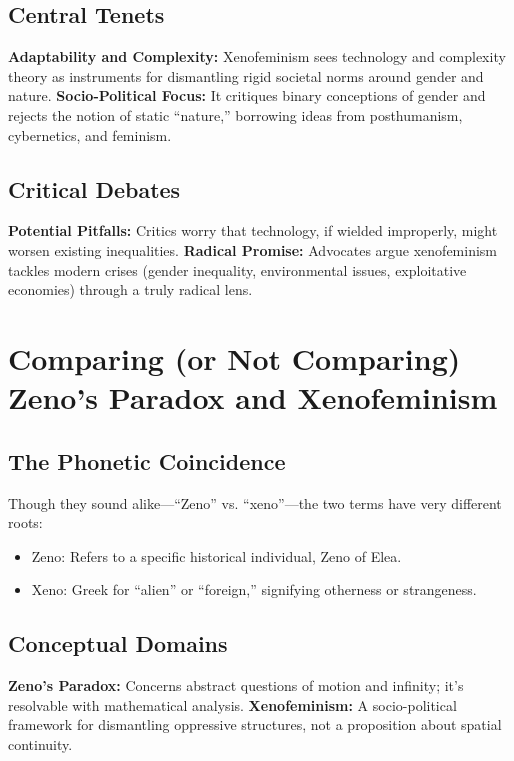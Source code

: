 \documentclass[12pt]{article}
\begin{document}
\subsection{Central Tenets}

\textbf{Adaptability and Complexity:} Xenofeminism sees technology and complexity theory as instruments for dismantling rigid societal norms around gender and nature.  
\textbf{Socio-Political Focus:} It critiques binary conceptions of gender and rejects the notion of static ``nature,'' borrowing ideas from posthumanism, cybernetics, and feminism.

\subsection{Critical Debates}

\textbf{Potential Pitfalls:} Critics worry that technology, if wielded improperly, might worsen existing inequalities.  
\textbf{Radical Promise:} Advocates argue xenofeminism tackles modern crises (gender inequality, environmental issues, exploitative economies) through a truly radical lens.

\section{Comparing (or Not Comparing) Zeno’s Paradox and Xenofeminism}

\subsection{The Phonetic Coincidence}

Though they sound alike---``Zeno'' vs. ``xeno''---the two terms have very different roots: 
\begin{itemize}
    \item Zeno: Refers to a specific historical individual, Zeno of Elea. 
    \item Xeno: Greek for ``alien'' or ``foreign,'' signifying otherness or strangeness.
\end{itemize}

\subsection{Conceptual Domains}

\textbf{Zeno’s Paradox:} Concerns abstract questions of motion and infinity; it's resolvable with mathematical analysis.  
\textbf{Xenofeminism:} A socio-political framework for dismantling oppressive structures, not a proposition about spatial continuity.
\end{document}
